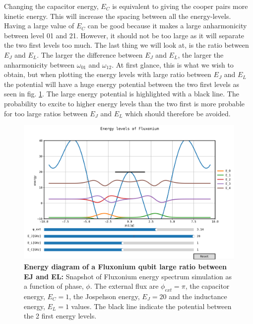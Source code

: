     Changing the capacitor energy, $E_C$ is equivalent to giving the cooper pairs more kinetic energy. This will increase the spacing between all the energy-levels. Having a large value of $E_C$ can be good because it makes a large anharmonicity between level 01 and 21. However, it should not be too large as it will separate the two first levels too much. 
    \newline
    \newline
    The last thing we will look at, is the ratio between $E_J$ and $E_L$. The larger the difference between $E_J$ and $E_L$, the larger the anharmonicity between $\omega_{01}$ and $\omega_{12}$. At first glance, this is what we wish to obtain, but when plotting the energy levels with large ratio between $E_J$ and $E_L$ the potential will have a huge energy potential between the two first levels as seen in fig. \ref{fig:Large_ratio_EJ_EL}. The large energy potential is highlighted with a black line. The probability to excite to higher energy levels than the two first is more probable for too large ratios between $E_J$ and $E_L$ which should therefore be avoided. 
    \begin{figure}
        \centering
        \includegraphics[width = 13.5cm]{Images/Wavefunctions_and_eigenstates_Fluxonium_large_EJ.png}
        \caption[Energy diagram of a Fluxonium qubit large ratio between EJ and EL]{\textbf{Energy diagram of a Fluxonium qubit large ratio between EJ and EL:} Snapshot of Fluxonium energy spectrum simulation as a function of phase, $\phi$. The external flux are $\phi_{ext} = \pi$, the capacitor energy, $E_C= 1$, the Jospehson energy, $E_J = 20$ and the inductance energy, $E_L = 1$ values. The black line indicate the potential between the 2 first energy levels.}
        \label{fig:Large_ratio_EJ_EL}
    \end{figure}

